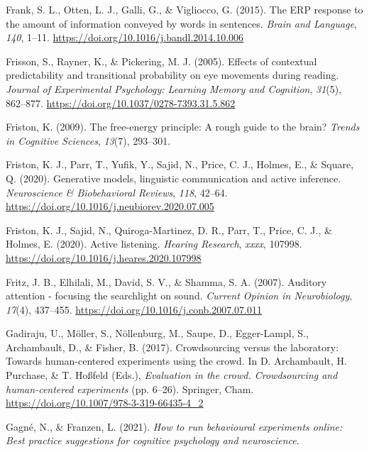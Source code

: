 \documentclass[a4paper, nobind]{templates/ociamthesis}
\newlength{\cslhangindent}
\newenvironment{CSLReferences}[2] %
 {%
  \setlength{\parindent}{0pt}
  \ifodd #1
  \let\oldpar\par
  \def\par{\hangindent=\cslhangindent\oldpar}
  \fi
  \setlength{\parskip}{1mm}
  \setlength{\baselineskip}{6mm}
 }%
 {}
\begin{document}
\begin{CSLReferences}{1}{0}
\leavevmode{}%
Frank, S. L., Otten, L. J., Galli, G., \& Vigliocco, G. (2015). {The ERP response to the amount of information conveyed by words in sentences}. \emph{Brain and Language}, \emph{140}, 1--11. \url{https://doi.org/10.1016/j.bandl.2014.10.006}

\leavevmode{}%
Frisson, S., Rayner, K., \& Pickering, M. J. (2005). {Effects of contextual predictability and transitional probability on eye movements during reading}. \emph{Journal of Experimental Psychology: Learning Memory and Cognition}, \emph{31}(5), 862--877. \url{https://doi.org/10.1037/0278-7393.31.5.862}

\leavevmode{}%
Friston, K. (2009). The free-energy principle: A rough guide to the brain? \emph{Trends in Cognitive Sciences}, \emph{13}(7), 293--301.

\leavevmode{}%
Friston, K. J., Parr, T., Yufik, Y., Sajid, N., Price, C. J., Holmes, E., \& Square, Q. (2020). {Generative models, linguistic communication and active inference}. \emph{Neuroscience {\&} Biobehavioral Reviews}, \emph{118}, 42--64. \url{https://doi.org/10.1016/j.neubiorev.2020.07.005}

\leavevmode{}%
Friston, K. J., Sajid, N., Quiroga-Martinez, D. R., Parr, T., Price, C. J., \& Holmes, E. (2020). {Active listening}. \emph{Hearing Research}, \emph{xxxx}, 107998. \url{https://doi.org/10.1016/j.heares.2020.107998}

\leavevmode{}%
Fritz, J. B., Elhilali, M., David, S. V., \& Shamma, S. A. (2007). {Auditory attention - focusing the searchlight on sound}. \emph{Current Opinion in Neurobiology}, \emph{17}(4), 437--455. \url{https://doi.org/10.1016/j.conb.2007.07.011}

\leavevmode{}%
Gadiraju, U., Möller, S., Nöllenburg, M., Saupe, D., Egger-Lampl, S., Archambault, D., \& Fisher, B. (2017). {Crowdsourcing versus the laboratory: Towards human-centered experiments using the crowd}. In D. Archambault, H. Purchase, \& T. Hoßfeld (Eds.), \emph{Evaluation in the crowd. Crowdsourcing and human-centered experiments} (pp. 6--26). Springer, Cham. \url{https://doi.org/10.1007/978-3-319-66435-4_2}

\leavevmode{}%
Gagné, N., \& Franzen, L. (2021). \emph{How to run behavioural experiments online: Best practice suggestions for cognitive psychology and neuroscience}.


\end{CSLReferences}
\end{document}
